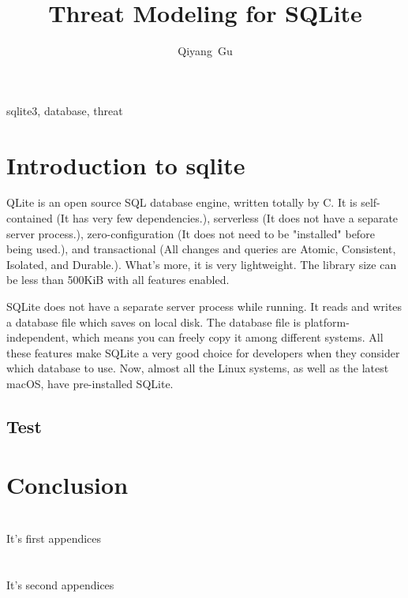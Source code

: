 \documentclass[journal]{IEEEtran}
\begin{document}
\title{Threat Modeling for SQLite}
\author{Qiyang~Gu}
\maketitle


\begin{abstract}
\blindtext
\end{abstract}

\begin{IEEEkeywords}
sqlite3, database, threat
\end{IEEEkeywords}


\section{Introduction to sqlite}
QLite is an open source SQL database engine, written totally by C. It is self-contained (It has very few dependencies.), serverless (It does not have a separate server process.), zero-configuration (It does not need to be "installed" before being used.), and transactional (All changes and queries are Atomic, Consistent, Isolated, and Durable.). What's more, it is very lightweight. The library size can be less than 500KiB with all features enabled.

SQLite does not have a separate server process while running. It reads and writes a database file which saves on local disk. The database file is platform-independent, which means you can freely copy it among different systems. All these features make SQLite a very good choice for developers when they consider which database to use. Now, almost all the Linux systems, as well as the latest macOS, have pre-installed SQLite.



\subsection{Test}
\blindtext
        

\section{Conclusion}
\blindtext
        
        
\appendices

\section{}
It's first appendices
        
\section{}
It's second appendices

    
\end{document}
